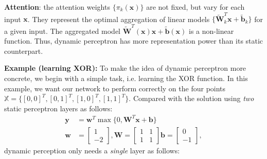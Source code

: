 \documentclass[10pt,twocolumn,letterpaper]{article}
\begin{document}
\noindent \textbf{Attention}: the attention weights $\{\pi_k(\bm{x})\}$ are not fixed, but vary for each input $\bm{x}$. They represent the optimal aggregation of linear models $\{\bm{\tilde{W}}^T_k\bm{x}+\bm{\tilde{b}}_k\}$ for a given input. 
The aggregated model $\bm{\tilde{W}}^T(\bm{x})\bm{x}+\bm{\tilde{b}}(\bm{x})$ is a non-linear function. Thus, dynamic perceptron has more representation power than its static counterpart.

\iffalse
\noindent \textbf{Example (learning XOR):} To make the idea of dynamic perceptron more concrete, we begin with a simple task, i.e. learning the XOR function. In this example, we want our network to perform correctly on the four points $\mathbb{X}=\{[0,0]^T, [0,1]^T, [1,0]^T, [1,1]^T\}$. Compared with the solution using \textit{two} static perceptron layers \cite{Goodfellow:2016:DL:3086952} as follows:
\begin{align}
\bm{y} &= \bm{w}^T\max\{0, \bm{W}^T\bm{x}+\bm{b}\} \nonumber \\
\bm{w}&=\begin{bmatrix}
    1 \\ -2
\end{bmatrix},
\bm{W}=\begin{bmatrix}
    1 & 1 \\ 1 & 1
\end{bmatrix}
\bm{b}=\begin{bmatrix}
    0 \\ -1
\end{bmatrix},
\label{eq:static-xor}
\end{align}
%
dynamic perception only needs a \textit{single} layer as follows:
\end{document}
